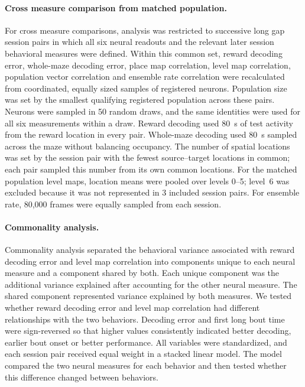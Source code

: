 \documentclass[fleqn,10pt]{wlscirep}
\begin{document}
\paragraph*{Cross measure comparison from matched population.}
For cross measure comparisons, analysis was restricted to successive long gap session pairs in which all six neural readouts and the relevant later session behavioral measures were defined. Within this common set, reward decoding error, whole-maze decoding error, place map correlation, level map correlation, population vector correlation and ensemble rate correlation were recalculated from coordinated, equally sized samples of registered neurons. Population size was set by the smallest qualifying registered population across these pairs. Neurons were sampled in 50 random draws, and the same identities were used for all six measurements within a draw. Reward decoding used 80~s of test activity from the reward location in every pair. Whole-maze decoding used 80~s sampled across the maze without balancing occupancy. The number of spatial locations was set by the session pair with the fewest source--target locations in common; each pair sampled this number from its own common locations. For the matched population level maps, location means were pooled over levels 0--5; level~6 was excluded because it was not represented in 3 included session pairs. For ensemble rate, 80,000 frames were equally sampled from each session. 

\paragraph*{Commonality analysis.}
Commonality analysis separated the behavioral variance associated with reward decoding error and level map correlation into components unique to each neural measure and a component shared by both. Each unique component was the additional variance explained after accounting for the other neural measure. The shared component represented variance explained by both measures. We tested whether reward decoding error and level map correlation had different relationships with the two behaviors. Decoding error and first long bout time were sign-reversed so that higher values consistently indicated better decoding, earlier bout onset or better performance. All variables were standardized, and each session pair received equal weight in a stacked linear model. The model compared the two neural measures for each behavior and then tested whether this difference changed between behaviors.
\end{document}
